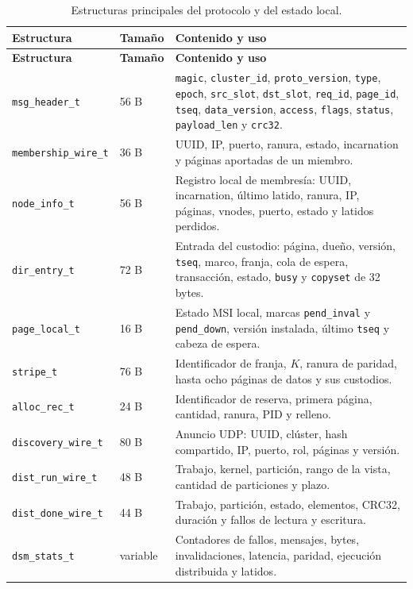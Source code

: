 {\footnotesize
\begin{xltabular}{\linewidth}{@{}l l Y@{}}
\caption{Estructuras principales del protocolo y del estado local.}\label{tab:estructuras-protocolo}\\
\toprule
\textbf{Estructura} & \textbf{Tamaño} & \textbf{Contenido y uso} \\
\midrule
\endfirsthead
\toprule
\textbf{Estructura} & \textbf{Tamaño} & \textbf{Contenido y uso} \\
\midrule
\endhead
\bottomrule
\endlastfoot
\texttt{msg\_header\_t} & 56 B & \texttt{magic}, \texttt{cluster\_id}, \texttt{proto\_version}, \texttt{type}, \texttt{epoch}, \texttt{src\_slot}, \texttt{dst\_slot}, \texttt{req\_id}, \texttt{page\_id}, \texttt{tseq}, \texttt{data\_version}, \texttt{access}, \texttt{flags}, \texttt{status}, \texttt{payload\_len} y \texttt{crc32}. \\
\texttt{membership\_wire\_t} & 36 B & UUID, IP, puerto, ranura, estado, incarnation y páginas aportadas de un miembro. \\
\texttt{node\_info\_t} & 56 B & Registro local de membresía: UUID, incarnation, último latido, ranura, IP, páginas, vnodes, puerto, estado y latidos perdidos. \\
\texttt{dir\_entry\_t} & 72 B & Entrada del custodio: página, dueño, versión, \texttt{tseq}, marco, franja, cola de espera, transacción, estado, \texttt{busy} y \texttt{copyset} de 32 bytes. \\
\texttt{page\_local\_t} & 16 B & Estado MSI local, marcas \texttt{pend\_inval} y \texttt{pend\_down}, versión instalada, último \texttt{tseq} y cabeza de espera. \\
\texttt{stripe\_t} & 76 B & Identificador de franja, $K$, ranura de paridad, hasta ocho páginas de datos y sus custodios. \\
\texttt{alloc\_rec\_t} & 24 B & Identificador de reserva, primera página, cantidad, ranura, PID y relleno. \\
\texttt{discovery\_wire\_t} & 80 B & Anuncio UDP: UUID, clúster, hash compartido, IP, puerto, rol, páginas y versión. \\
\texttt{dist\_run\_wire\_t} & 48 B & Trabajo, kernel, partición, rango de la vista, cantidad de particiones y plazo. \\
\texttt{dist\_done\_wire\_t} & 44 B & Trabajo, partición, estado, elementos, CRC32, duración y fallos de lectura y escritura. \\
\texttt{dsm\_stats\_t} & variable & Contadores de fallos, mensajes, bytes, invalidaciones, latencia, paridad, ejecución distribuida y latidos. \\
\end{xltabular}
}

